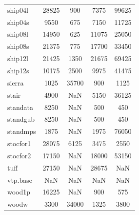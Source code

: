 \begin{longtable}{lcccc}
ship04l  &    28825 &   900 &     7375 &    99625 \\
ship04s  &     9550 &   675 &     7150 &    11725 \\
ship08l  &    14950 &   625 &    11075 &    25050 \\
ship08s  &    21375 &   775 &    17700 &    33450 \\
ship12l  &    21425 &  1350 &    21675 &    69425 \\
ship12s  &    10175 &  2500 &     9975 &    41475 \\
sierra   &     1025 & 35700 &      900 &     1125 \\
stair    &     4900 &   NaN &     5150 &    36125 \\
standata &     8250 &   NaN &      500 &      450 \\
standgub &     8250 &   NaN &      500 &      450 \\
standmps &     1875 &   NaN &     1975 &    76050 \\
stocfor1 &    28075 &  6125 &     3475 &     2550 \\
stocfor2 &    17150 &   NaN &    18000 &    53150 \\
tuff     &    27150 &   NaN &    28675 &      NaN \\
vtp.base &      NaN &   NaN &      NaN &      NaN \\
wood1p   &    16225 &   NaN &      900 &      575 \\
woodw    &     3300 & 34000 &     1325 &     3800 \\
\end{longtable}
